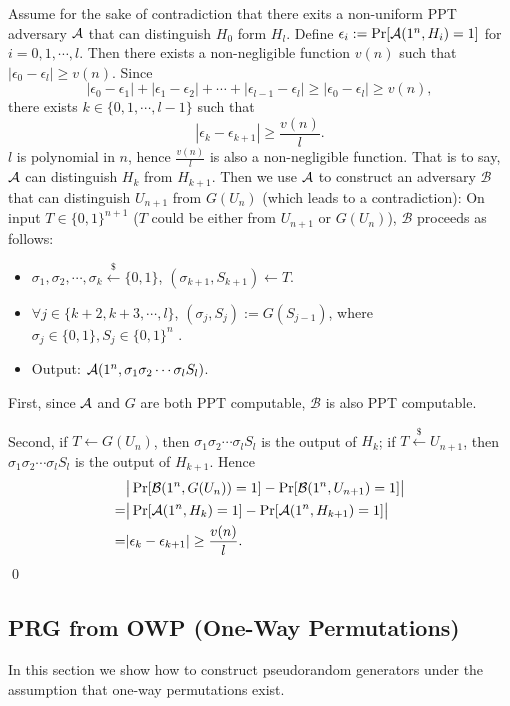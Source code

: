 Assume for the sake of contradiction that there exits a non-uniform PPT adversary ${\mathcal A}$ that can distinguish $H_0$ form $H_l$.
Define $\epsilon_i := \Pr[{\mathcal A}(1^n, H_i)=1]$ for $i = 0, 1, \cdots, l$.
Then there exists a non-negligible function $v(n)$ such that $|\epsilon_0 - \epsilon_l| \geq v(n)$.
Since
\[
|\epsilon_0 - \epsilon_1| +
|\epsilon_1 - \epsilon_2| +
\cdots +
|\epsilon_{l-1} - \epsilon_l| \geq
|\epsilon_0 - \epsilon_l|
\geq v(n),
\]
there exists $k \in \{0, 1, \cdots, l-1\}$ such that
\[
|\epsilon_{k} - \epsilon_{k+1}| \geq \frac{v(n)}{l}.
\]
$l$ is polynomial in $n$, hence $\frac{v(n)}{l}$ is also a non-negligible function.
That is to say, ${\mathcal A}$ can distinguish $H_{k}$ from $H_{k+1}$.
Then we use ${\mathcal A}$ to construct an adversary $\mathcal{B}$ that can distinguish $U_{n+1}$ from $G(U_n)$ (which leads to a contradiction):
On input $T \in \{0, 1\}^{n+1}$ ($T$ could be either from $U_{n+1}$ or $G(U_n)$), $\mathcal{B}$ proceeds as follows:
\begin{itemize}
\item $\sigma_1, \sigma_2, \cdots, \sigma_k \xleftarrow{\$} \{0, 1\}$, $(\sigma_{k+1}, S_{k+1}) \gets T$.
\item $\forall j \in \{k+2, k+3, \cdots, l\}$, $(\sigma_j, S_j) := G(S_{j-1})$, where $\sigma_j \in \{0, 1\}, S_j \in \{0, 1\}^n$ .
\item Output: ${\mathcal A}(1^n, \sigma_1 \sigma_2 \cdots \sigma_l S_l)$.
\end{itemize}

First, since ${\mathcal A}$ and $G$ are both PPT computable, $\mathcal{B}$ is also PPT computable.

Second, if $T\gets G(U_n)$, then $\sigma_1 \sigma_2 \cdots \sigma_l S_l$ is the output of  $H_{k}$; if $T \stackrel{\$}\leftarrow U_{n+1}$, then $\sigma_1 \sigma_2 \cdots \sigma_l S_l$ is the output of $H_{k+1}$.
Hence
\begin{align*}
&\big|\Pr[\mathcal{B}(1^n, G(U_n)) = 1] - \Pr[\mathcal{B}(1^n, U_{n+1}) = 1]\big|\\
=& \big|\Pr[{\mathcal A}(1^n,H_k) = 1] - \Pr[{\mathcal A}(1^n,H_{k+1}) = 1]\big|\\
=&
|\epsilon_{k} - \epsilon_{k+1}| \geq \frac{v(n)}{l}.
\end{align*}
\qed

\subsection{PRG from OWP (One-Way Permutations)}
In this section we show how to construct pseudorandom generators under the assumption that one-way permutations exist.

